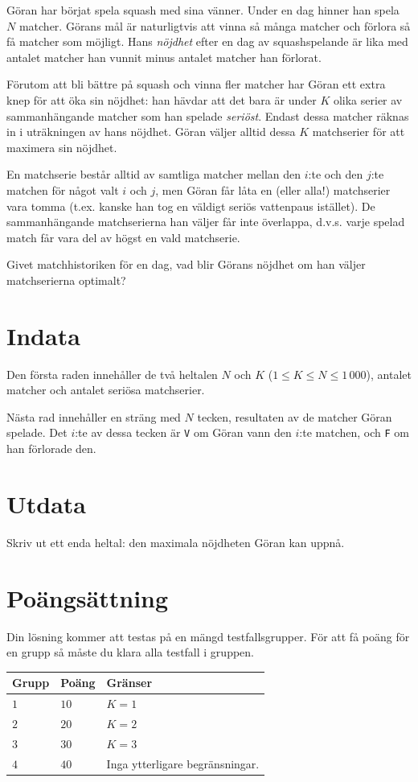 Göran har börjat spela squash med sina vänner.
Under en dag hinner han spela $N$ matcher.
Görans mål är naturligtvis att vinna så många matcher och förlora så få matcher som möjligt.
Hans \emph{nöjdhet} efter en dag av squashspelande är lika med antalet matcher han vunnit minus antalet matcher han förlorat.

Förutom att bli bättre på squash och vinna fler matcher har Göran ett extra knep för att öka sin nöjdhet: han hävdar att det bara är under $K$ olika serier av sammanhängande matcher som han spelade \emph{seriöst}.
Endast dessa matcher räknas in i uträkningen av hans nöjdhet.
Göran väljer alltid dessa $K$ matchserier för att maximera sin nöjdhet.

En matchserie består alltid av samtliga matcher mellan den $i$:te och den $j$:te matchen för något valt $i$ och $j$, men Göran får låta en (eller alla!) matchserier vara tomma (t.ex. kanske han tog en väldigt seriös vattenpaus istället).
De sammanhängande matchserierna han väljer får inte överlappa, d.v.s. varje spelad match får vara del av högst en vald matchserie.

Givet matchhistoriken för en dag, vad blir Görans nöjdhet om han väljer matchserierna optimalt?

\section*{Indata}
Den första raden innehåller de två heltalen $N$ och $K$ ($1 \le K \le N \le 1\,000$), antalet matcher och antalet seriösa matchserier.

Nästa rad innehåller en sträng med $N$ tecken, resultaten av de matcher Göran spelade.
Det $i$:te av dessa tecken är \texttt{V} om Göran vann den $i$:te matchen, och \texttt{F} om han förlorade den.

\section*{Utdata}
Skriv ut ett enda heltal: den maximala nöjdheten Göran kan uppnå.

\section*{Poängsättning}
Din lösning kommer att testas på en mängd testfallsgrupper.
För att få poäng för en grupp så måste du klara alla testfall i gruppen.

\noindent
\begin{tabular}{| l | l | p{12cm} |}
  \hline
  \textbf{Grupp} & \textbf{Poäng} & \textbf{Gränser} \\ \hline
  $1$    & $10$      & $K = 1$ \\ \hline
  $2$    & $20$      & $K = 2$ \\ \hline
  $3$    & $30$      & $K = 3$ \\ \hline
  $4$    & $40$      & Inga ytterligare begränsningar. \\ \hline
\end{tabular}

